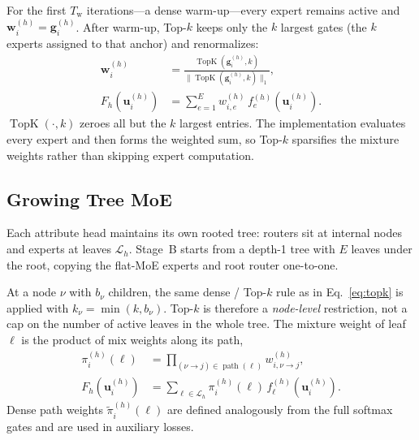 For the first $T_{\mathrm{w}}$ iterations---a dense warm-up---every expert remains active and $\mathbf{w}_i^{(h)}=\mathbf{g}_i^{(h)}$.
After warm-up, Top-$k$ keeps only the $k$ largest gates (the $k$ experts assigned to that anchor) and renormalizes:
\begin{equation}
\begin{aligned}
\mathbf{w}_i^{(h)}
&=
\frac{\operatorname{TopK}(\mathbf{g}_i^{(h)},k)}
{\|\operatorname{TopK}(\mathbf{g}_i^{(h)},k)\|_{1}},
\\
F_h(\mathbf{u}_i^{(h)})
&=
\sum_{e=1}^{E}
w_{i,e}^{(h)}\,f_e^{(h)}(\mathbf{u}_i^{(h)}).
\end{aligned}
\label{eq:topk}
\end{equation}
$\operatorname{TopK}(\cdot,k)$ zeroes all but the $k$ largest entries.
The implementation evaluates every expert and then forms the weighted sum, so Top-$k$ sparsifies the mixture weights rather than skipping expert computation.

\subsection{Growing Tree MoE}
\label{sec:tree}

Each attribute head maintains its own rooted tree: routers sit at internal nodes and experts at leaves $\mathcal{L}_h$.
Stage~B starts from a depth-1 tree with $E$ leaves under the root, copying the flat-MoE experts and root router one-to-one.

At a node $\nu$ with $b_{\nu}$ children, the same dense / Top-$k$ rule as in Eq.~\eqref{eq:topk} is applied with
$k_{\nu}=\min(k,b_{\nu})$.
Top-$k$ is therefore a \emph{node-level} restriction, not a cap on the number of active leaves in the whole tree.
The mixture weight of leaf $\ell$ is the product of mix weights along its path,
\begin{equation}
\begin{aligned}
\pi_i^{(h)}(\ell)
&=
\prod_{(\nu\rightarrow j)\in\operatorname{path}(\ell)}
w_{i,\nu\rightarrow j}^{(h)},
\\
F_h(\mathbf{u}_i^{(h)})
&=
\sum_{\ell\in\mathcal{L}_h}
\pi_i^{(h)}(\ell)\,f_\ell^{(h)}(\mathbf{u}_i^{(h)}).
\end{aligned}
\label{eq:tree-output}
\end{equation}
Dense path weights $\tilde{\pi}_i^{(h)}(\ell)$ are defined analogously from the full softmax gates and are used in auxiliary losses.

